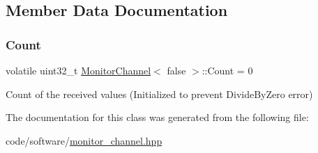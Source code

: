 \subsection{Member Data Documentation}
\mbox{\label{classMonitorChannel_3_01false_01_4_a9642a29309b4919130d0fb9573af3a05}} 
\subsubsection{\texorpdfstring{Count}{Count}}
{\footnotesize\ttfamily volatile uint32\+\_\+t \hyperlink{classMonitorChannel}{Monitor\+Channel}$<$ false $>$\+::Count = 0}



Count of the received values (Initialized to prevent Divide\+By\+Zero error) 



The documentation for this class was generated from the following file\+:\begin{DoxyCompactItemize}
\item 
code/software/\hyperlink{monitor__channel_8hpp}{monitor\+\_\+channel.\+hpp}\end{DoxyCompactItemize}
